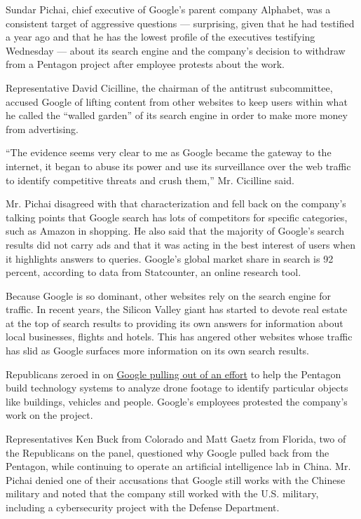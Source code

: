 Sundar Pichai, chief executive of Google's parent company Alphabet, was
a consistent target of aggressive questions --- surprising, given that
he had testified a year ago and that he has the lowest profile of the
executives testifying Wednesday --- about its search engine and the
company's decision to withdraw from a Pentagon project after employee
protests about the work.

Representative David Cicilline, the chairman of the antitrust
subcommittee, accused Google of lifting content from other websites to
keep users within what he called the ``walled garden'' of its search
engine in order to make more money from advertising.

``The evidence seems very clear to me as Google became the gateway to
the internet, it began to abuse its power and use its surveillance over
the web traffic to identify competitive threats and crush them,'' Mr.
Cicilline said.

Mr. Pichai disagreed with that characterization and fell back on the
company's talking points that Google search has lots of competitors for
specific categories, such as Amazon in shopping. He also said that the
majority of Google's search results did not carry ads and that it was
acting in the best interest of users when it highlights answers to
queries. Google's global market share in search is 92 percent, according
to data from Statcounter, an online research tool.

Because Google is so dominant, other websites rely on the search engine
for traffic. In recent years, the Silicon Valley giant has started to
devote real estate at the top of search results to providing its own
answers for information about local businesses, flights and hotels. This
has angered other websites whose traffic has slid as Google surfaces
more information on its own search results.

Republicans zeroed in on
\href{https://slack-redir.net/link?url=https\%3A\%2F\%2Fwww.nytimes3xbfgragh.onion\%2F2018\%2F06\%2F01\%2Ftechnology\%2Fgoogle-pentagon-project-maven.html}{Google
pulling out of an effort} to help the Pentagon build technology systems
to analyze drone footage to identify particular objects like buildings,
vehicles and people. Google's employees protested the company's work on
the project.

Representatives Ken Buck from Colorado and Matt Gaetz from Florida, two
of the Republicans on the panel, questioned why Google pulled back from
the Pentagon, while continuing to operate an artificial intelligence lab
in China. Mr. Pichai denied one of their accusations that Google still
works with the Chinese military and noted that the company still worked
with the U.S. military, including a cybersecurity project with the
Defense Department.


